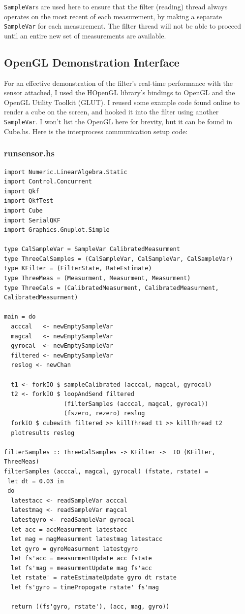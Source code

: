 \documentclass[12pt]{report}
\begin{document}
\lstinline$SampleVar$s are used here to ensure that the filter (reading) thread always operates on the most recent of each measurement, by making a separate \lstinline$SampleVar$ for each measurement. The filter thread will not be able to proceed until an entire new set of measurements are available.

\subsection{OpenGL Demonstration Interface}

For an effective demonstration of the filter's real-time performance with the sensor attached, I used the HOpenGL library's bindings to OpenGL and the OpenGL Utility Toolkit (GLUT). I reused some example code found online to render a cube on the screen, and hooked it into the filter using another \lstinline$SampleVar$. I won't list the OpenGL here for brevity, but it can be found in Cube.hs. Here is the interprocess communication setup code:

\subsubsection{runsensor.hs}
\begin{lstlisting}
import Numeric.LinearAlgebra.Static
import Control.Concurrent
import Qkf
import QkfTest
import Cube
import SerialQKF
import Graphics.Gnuplot.Simple

type CalSampleVar = SampleVar CalibratedMeasurment
type ThreeCalSamples = (CalSampleVar, CalSampleVar, CalSampleVar)
type KFilter = (FilterState, RateEstimate)
type ThreeMeas = (Measurment, Measurment, Measurment)
type ThreeCals = (CalibratedMeasurment, CalibratedMeasurment, CalibratedMeasurment)

main = do
  acccal   <- newEmptySampleVar
  magcal   <- newEmptySampleVar
  gyrocal  <- newEmptySampleVar
  filtered <- newEmptySampleVar
  reslog <- newChan

  t1 <- forkIO $ sampleCalibrated (acccal, magcal, gyrocal)
  t2 <- forkIO $ loopAndSend filtered 
			     (filterSamples (acccal, magcal, gyrocal)) 
			     (fszero, rezero) reslog
  forkIO $ cubewith filtered >> killThread t1 >> killThread t2
  plotresults reslog

filterSamples :: ThreeCalSamples -> KFilter ->  IO (KFilter, ThreeMeas)
filterSamples (acccal, magcal, gyrocal) (fstate, rstate) = 
 let dt = 0.03 in
 do
  latestacc <- readSampleVar acccal
  latestmag <- readSampleVar magcal
  latestgyro <- readSampleVar gyrocal
  let acc = accMeasurment latestacc
  let mag = magMeasurment latestmag latestacc
  let gyro = gyroMeasurment latestgyro  
  let fs'acc = measurmentUpdate acc fstate
  let fs'mag = measurmentUpdate mag fs'acc
  let rstate' = rateEstimateUpdate gyro dt rstate
  let fs'gyro = timePropogate rstate' fs'mag
  
  return ((fs'gyro, rstate'), (acc, mag, gyro))

\end{lstlisting}
\end{document}
